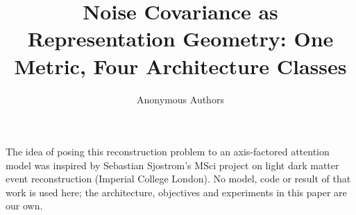 \documentclass{article}
\title{Noise Covariance as Representation Geometry: One Metric, Four Architecture Classes}
\author{Anonymous Authors}
\begin{document}
\maketitle







\begin{ack}
The idea of posing this reconstruction problem to an axis-factored attention
model was inspired by Sebastian Sjostrom's MSci project on light dark matter
event reconstruction (Imperial College London). No model, code or result of
that work is used here; the architecture, objectives and experiments in this
paper are our own.
\end{ack}

\clearpage



\clearpage
\appendix


\end{document}
